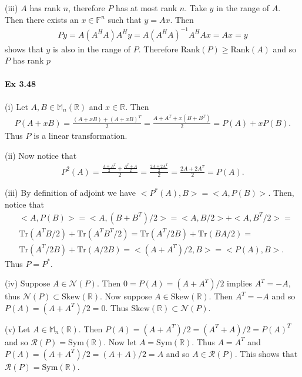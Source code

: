 \documentclass[letterpaper,12pt]{article}
\theoremstyle{definition}
\begin{document}
\begin{spacing}{1.3}{}
	(iii)
	$A$ has rank $n$, therefore $P$ has at most rank $n$.
	Take $y$ in the range of $A$.
	Then there exists an $x\in\mathbb F^n$ such that $y=Ax$.
	Then
	\begin{align*}
	Py=A(A^HA)A^Hy=A(A^HA)^{-1}A^HAx=Ax=y
	\end{align*}
	shows that $y$ is also in the range of $P$.
	Therefore $\text{Rank}(P)\geq\text{Rank}(A)$ and so $P$ has rank $p$ \\\\
	
	\textbf{Ex 3.48} \\\\
	(i)
	Let $A,B\in\mathbb M_n(\mathbb R)$ and $x\in\mathbb R$.
	Then
	\begin{align*}
	P(A+xB)=\frac{(A+xB)+(A+xB)^T}{2}=
	\frac{A+A^T+x(B+B^T)}{2}=P(A)+xP(B).
	\end{align*}
	Thus $P$ is a linear transformation.
	
	(ii)
	Now notice that
	\begin{align*}
	P^2(A)=\frac{\frac{A+A^T}{2}+\frac{A^T+A}{2}}{2}=
	\frac{\frac{2A+2A^T}{2}}{2}=\frac{2A+2A^T}{2}=P(A).
	\end{align*}
	
	(iii)
	By definition of adjoint we have $<P^*(A),B>=<A,P(B)>$.
	Then, notice that
	\begin{align*}
	&<A,P(B)>=<A,(B+B^T)/2>=
	<A,B/2>+<A,B^T/2>=\\
	&\text{Tr}(A^TB/2)+\text{Tr}(A^TB^T/2)=
	\text{Tr}(A^T/2B)+\text{Tr}(BA/2)=\\
	&\text{Tr}(A^T/2B)+\text{Tr}(A/2B)=
	<(A+A^T)/2,B>=<P(A),B>.
	\end{align*}
	Thus $P=P^*$.
	
	(iv)
	Suppose $A\in\mathcal N(P)$.
	Then $0=P(A)=(A+A^T)/2$ implies $A^T=-A$, thus $\mathcal N(P)\subset\text{Skew}(\mathbb R)$.
	Now suppose $A\in\text{Skew}(\mathbb R)$.
	Then $A^T=-A$ and so $P(A)=(A+A^T)/2=0$. Thus $\text{Skew}(\mathbb R)\subset\mathcal N(P)$.
	
	(v)
	Let $A\in\mathbb M_n(\mathbb R)$.
	Then $P(A)=(A+A^T)/2=(A^T+A)/2=P(A)^T$ and so $\mathcal R(P)=\text{Sym}(\mathbb R)$.
	Now let $A=\text{Sym}(\mathbb R)$.
	Thus $A=A^T$ and $P(A)=(A+A^T)/2=(A+A)/2=A$ and so $A\in\mathcal R(P)$.
	This shows that $\mathcal R(P)=\text{Sym}(\mathbb R)$.
	

\end{spacing}
\end{document}
